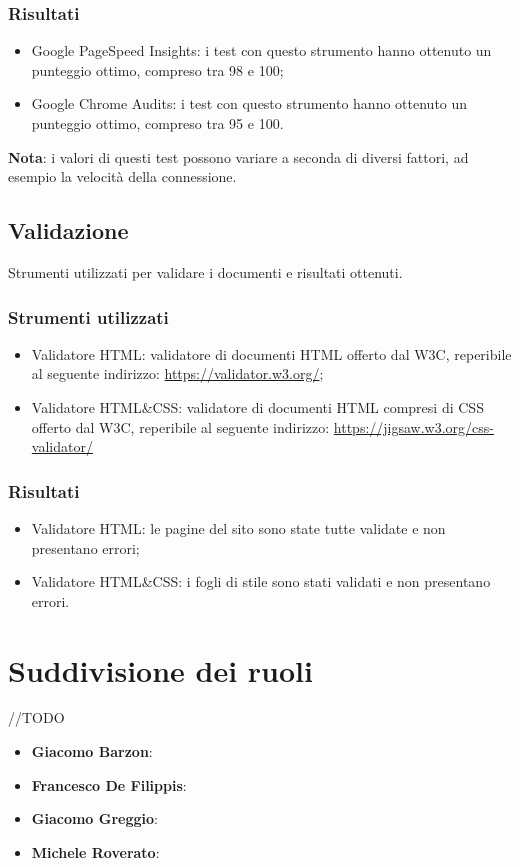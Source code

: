 \documentclass[12pt]{article}
\begin{document}
	\subsubsection{Risultati}
		\begin{itemize}
			\item Google PageSpeed Insights: i test con questo strumento hanno ottenuto un punteggio ottimo, compreso tra 98 e 100;
			\item Google Chrome Audits: i test con questo strumento hanno ottenuto un punteggio ottimo, compreso tra 95 e 100.
		\end{itemize}
	\textbf{Nota}: i valori di questi test possono variare a seconda di diversi fattori, ad esempio la velocità della connessione.
	\subsection{Validazione}
	Strumenti utilizzati per validare i documenti e risultati ottenuti.
	\subsubsection{Strumenti utilizzati}
	\begin{itemize}
		\item Validatore HTML: validatore di documenti HTML offerto dal W3C, reperibile al seguente indirizzo: \url{https://validator.w3.org/};
		\item Validatore HTML\&CSS: validatore di documenti HTML compresi di CSS offerto dal W3C, reperibile al seguente indirizzo: \url{https://jigsaw.w3.org/css-validator/}
	\end{itemize}
	\subsubsection{Risultati}
		\begin{itemize}
			\item Validatore HTML: le pagine del sito sono state tutte validate e non presentano errori;
			\item Validatore HTML\&CSS: i fogli di stile sono stati validati e non presentano errori.
		\end{itemize}
	
	\section{Suddivisione dei ruoli}
	//TODO
	\begin{itemize}
		\item \textbf{Giacomo Barzon}:
		\item \textbf{Francesco De Filippis}: 
		\item \textbf{Giacomo Greggio}:
		\item \textbf{Michele Roverato}:
	\end{itemize}
\end{document}
